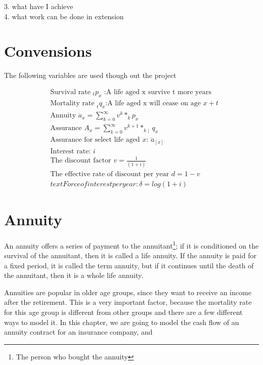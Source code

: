 \documentclass{report}
\begin{document}
3. what have I achieve\\
4. what work can be done in extension\\








\chapter*{Convensions}



The following variables are used though out the project

\begin{align*}
&\text{Survival rate }_t p_x \text{ :A life aged x survive t more years}\\
&\text{Mortality rate } _t q_x \text{:A life aged x will cease on age $x+t$}\\
&\text{Annuity  }\ddot{a}_x = \sum_{k=0}^{\infty} v^k*_kp_x\\
&\text{Assurance  }A_x = \sum_{k=0}^{\infty} v^{k+1}*_{k\mid} q_x\\
&\text{Assurance for select life aged $x$: }\ddot{a}_{[x]}\\
&\text{Interest rate: } i\\
&\text{The discount factor } v = \frac{1}{(1+i)} \\
&\text{The effective rate of discount per year } d =1-v\\
&text{Force of interest per year:} \delta =log(1+i)
\end{align*}





\chapter{Annuity}    \label{annuity}

An annuity offers a series of payment to the annuitant\footnote{The person who bought the annuity}; if it is conditioned on the survival of the annuitant, then it is called a life annuity. If the annuity is paid for a fixed period, it is called the term annuity, but if it continues until the death of the annuitant, then it is a whole life annuity.


Annuities are popular in older age groups, since they want to receive an income after the retirement. This is a very important factor, because the mortality rate for this age group is different from other groups and there are a few different ways to model it. In this chapter, we are going to model the cash flow of an annuity contract for an insurance company, and 
\end{document}
